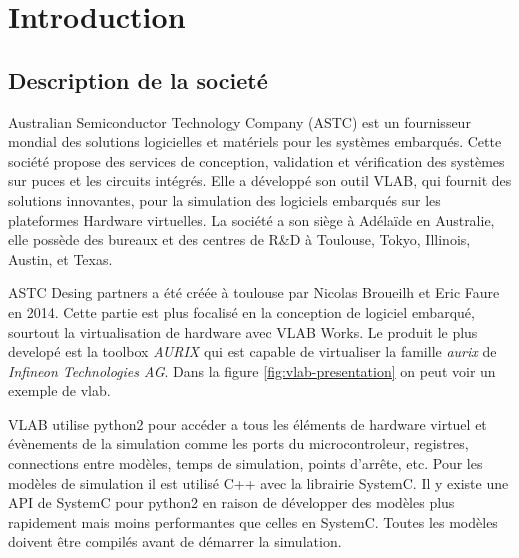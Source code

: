 \section{Introduction}

\subsection{Description de la societ\'e}
Australian Semiconductor Technology Company (ASTC) est un fournisseur mondial des solutions logicielles et matériels pour les systèmes embarqués. Cette soci\'et\'e propose des services de conception, validation et vérification des systèmes sur puces et les circuits intégrés. Elle a développé son outil VLAB, qui fournit des solutions innovantes, pour la simulation des logiciels embarqués sur les plateformes Hardware virtuelles. La société a son siège à Adélaïde en Australie, elle possède des bureaux et des centres de R\&D à Toulouse, Tokyo, Illinois, Austin, et Texas. 

ASTC Desing partners a été créée \`a toulouse par Nicolas Broueilh et Eric Faure en 2014. Cette partie est plus focalis\'e en la conception de logiciel embarqu\'e, sourtout la virtualisation de hardware avec VLAB Works. Le produit le plus develop\'e est la toolbox \textit{AURIX} qui est capable de virtualiser la famille \textit{aurix} de \textit{Infineon Technologies AG}. Dans la figure \ref{fig:vlab-presentation} on peut voir un exemple de vlab.

VLAB utilise python2 pour accéder a tous les éléments de hardware virtuel et évènements de la simulation comme les ports du microcontroleur, registres, connections entre mod\`eles, temps de simulation, points d'arrête, etc. Pour les modèles de simulation il est utilis\'e C++ avec la librairie SystemC. Il y existe une API de SystemC pour python2 en raison de développer des mod\`eles plus rapidement mais moins performantes que celles en SystemC. Toutes les mod\`eles doivent \^etre compil\'es avant de d\'emarrer la simulation.



